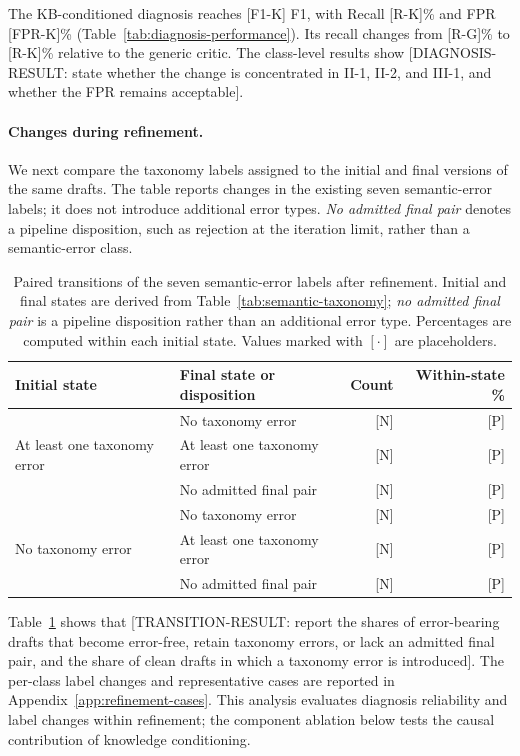 \documentclass[letterpaper,journal]{IEEEtran}
\begin{document}
The KB-conditioned diagnosis reaches [F1-K] F1, with Recall [R-K]\% and FPR [FPR-K]\% (Table~\ref{tab:diagnosis-performance}). Its recall changes from [R-G]\% to [R-K]\% relative to the generic critic. The class-level results show [DIAGNOSIS-RESULT: state whether the change is concentrated in II-1, II-2, and III-1, and whether the FPR remains acceptable].

\paragraph{Changes during refinement.}
We next compare the taxonomy labels assigned to the initial and final versions of the same drafts. The table reports changes in the existing seven semantic-error labels; it does not introduce additional error types. \emph{No admitted final pair} denotes a pipeline disposition, such as rejection at the iteration limit, rather than a semantic-error class.

\begin{table}[!t]
\centering
\caption{Paired transitions of the seven semantic-error labels after refinement. Initial and final states are derived from Table~\ref{tab:semantic-taxonomy}; \emph{no admitted final pair} is a pipeline disposition rather than an additional error type. Percentages are computed within each initial state. Values marked with $[\cdot]$ are placeholders.}
\label{tab:refinement-transitions}
\small
\setlength{\tabcolsep}{4pt}
\begin{tabular}{llrr}
\toprule
\textbf{Initial state} & \textbf{Final state or disposition} & \textbf{Count} & \textbf{Within-state \%} \\
\midrule
\multirow{3}{*}{At least one taxonomy error}
& No taxonomy error & [N] & [P] \\
& At least one taxonomy error & [N] & [P] \\
& No admitted final pair & [N] & [P] \\
\midrule
\multirow{3}{*}{No taxonomy error}
& No taxonomy error & [N] & [P] \\
& At least one taxonomy error & [N] & [P] \\
& No admitted final pair & [N] & [P] \\
\bottomrule
\end{tabular}
\end{table}

Table~\ref{tab:refinement-transitions} shows that [TRANSITION-RESULT: report the shares of error-bearing drafts that become error-free, retain taxonomy errors, or lack an admitted final pair, and the share of clean drafts in which a taxonomy error is introduced]. The per-class label changes and representative cases are reported in Appendix~\ref{app:refinement-cases}. This analysis evaluates diagnosis reliability and label changes within refinement; the component ablation below tests the causal contribution of knowledge conditioning.
\end{document}
